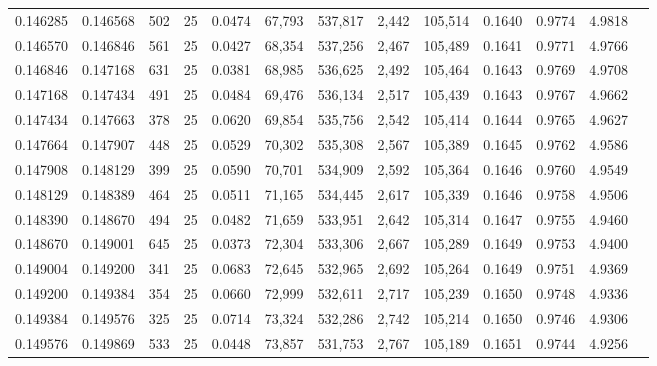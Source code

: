 \begin{tabular}{rrrrrrrrrrrrr}
0.146285 & 0.146568 &   502 &  25 &                                     0.0474 &  67,793 & 537,817 &   2,442 & 105,514 & 0.1640 & 0.9774 & 4.9818 \\
0.146570 & 0.146846 &   561 &  25 &                                     0.0427 &  68,354 & 537,256 &   2,467 & 105,489 & 0.1641 & 0.9771 & 4.9766 \\
0.146846 & 0.147168 &   631 &  25 &                                     0.0381 &  68,985 & 536,625 &   2,492 & 105,464 & 0.1643 & 0.9769 & 4.9708 \\
0.147168 & 0.147434 &   491 &  25 &                                     0.0484 &  69,476 & 536,134 &   2,517 & 105,439 & 0.1643 & 0.9767 & 4.9662 \\
0.147434 & 0.147663 &   378 &  25 &                                     0.0620 &  69,854 & 535,756 &   2,542 & 105,414 & 0.1644 & 0.9765 & 4.9627 \\
0.147664 & 0.147907 &   448 &  25 &                                     0.0529 &  70,302 & 535,308 &   2,567 & 105,389 & 0.1645 & 0.9762 & 4.9586 \\
0.147908 & 0.148129 &   399 &  25 &                                     0.0590 &  70,701 & 534,909 &   2,592 & 105,364 & 0.1646 & 0.9760 & 4.9549 \\
0.148129 & 0.148389 &   464 &  25 &                                     0.0511 &  71,165 & 534,445 &   2,617 & 105,339 & 0.1646 & 0.9758 & 4.9506 \\
0.148390 & 0.148670 &   494 &  25 &                                     0.0482 &  71,659 & 533,951 &   2,642 & 105,314 & 0.1647 & 0.9755 & 4.9460 \\
0.148670 & 0.149001 &   645 &  25 &                                     0.0373 &  72,304 & 533,306 &   2,667 & 105,289 & 0.1649 & 0.9753 & 4.9400 \\
0.149004 & 0.149200 &   341 &  25 &                                     0.0683 &  72,645 & 532,965 &   2,692 & 105,264 & 0.1649 & 0.9751 & 4.9369 \\
0.149200 & 0.149384 &   354 &  25 &                                     0.0660 &  72,999 & 532,611 &   2,717 & 105,239 & 0.1650 & 0.9748 & 4.9336 \\
0.149384 & 0.149576 &   325 &  25 &                                     0.0714 &  73,324 & 532,286 &   2,742 & 105,214 & 0.1650 & 0.9746 & 4.9306 \\
0.149576 & 0.149869 &   533 &  25 &                                     0.0448 &  73,857 & 531,753 &   2,767 & 105,189 & 0.1651 & 0.9744 & 4.9256 \\

\end{tabular}
